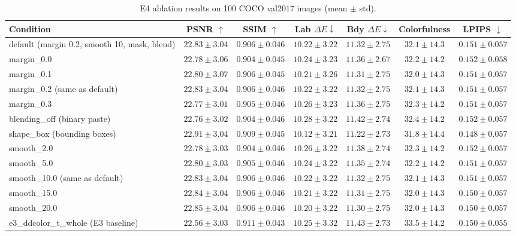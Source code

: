 \documentclass{FastFyp}
\begin{document}
\begin{table}[htbp]
\centering
\caption{E4 ablation results on 100 COCO val2017 images (mean $\pm$ std).}
\label{tab:e4-summary}
\small
\begin{tabular}{lcccccc}
\hline
Condition & PSNR $\uparrow$ & SSIM $\uparrow$ & Lab $\Delta E\downarrow$ & Bdy $\Delta E\downarrow$ & Colorfulness & LPIPS $\downarrow$ \\
\hline
default (margin 0.2, smooth 10, mask, blend) & $22.83\pm3.04$ & $0.906\pm0.046$ & $10.22\pm3.22$ & $11.32\pm2.75$ & $32.1\pm14.3$ & $0.151\pm0.057$ \\
margin\_0.0 & $22.78\pm3.06$ & $0.904\pm0.045$ & $10.24\pm3.23$ & $11.36\pm2.67$ & $32.2\pm14.2$ & $0.152\pm0.058$ \\
margin\_0.1 & $22.80\pm3.07$ & $0.906\pm0.045$ & $10.21\pm3.26$ & $11.31\pm2.75$ & $32.0\pm14.3$ & $0.151\pm0.057$ \\
margin\_0.2 (same as default) & $22.83\pm3.04$ & $0.906\pm0.046$ & $10.22\pm3.22$ & $11.32\pm2.75$ & $32.1\pm14.3$ & $0.151\pm0.057$ \\
margin\_0.3 & $22.77\pm3.01$ & $0.905\pm0.046$ & $10.26\pm3.23$ & $11.36\pm2.75$ & $32.3\pm14.2$ & $0.151\pm0.057$ \\
blending\_off (binary paste) & $22.76\pm3.02$ & $0.904\pm0.046$ & $10.28\pm3.22$ & $11.42\pm2.74$ & $32.4\pm14.2$ & $0.152\pm0.057$ \\
shape\_box (bounding boxes) & $22.91\pm3.04$ & $0.909\pm0.045$ & $10.12\pm3.21$ & $11.22\pm2.73$ & $31.8\pm14.4$ & $0.148\pm0.057$ \\
smooth\_2.0 & $22.78\pm3.03$ & $0.904\pm0.046$ & $10.26\pm3.22$ & $11.38\pm2.74$ & $32.3\pm14.2$ & $0.152\pm0.057$ \\
smooth\_5.0 & $22.80\pm3.03$ & $0.905\pm0.046$ & $10.24\pm3.22$ & $11.35\pm2.74$ & $32.2\pm14.2$ & $0.151\pm0.057$ \\
smooth\_10.0 (same as default) & $22.83\pm3.04$ & $0.906\pm0.046$ & $10.22\pm3.22$ & $11.32\pm2.75$ & $32.1\pm14.3$ & $0.151\pm0.057$ \\
smooth\_15.0 & $22.84\pm3.04$ & $0.906\pm0.046$ & $10.21\pm3.22$ & $11.31\pm2.75$ & $32.0\pm14.3$ & $0.150\pm0.057$ \\
smooth\_20.0 & $22.85\pm3.04$ & $0.906\pm0.046$ & $10.20\pm3.22$ & $11.30\pm2.75$ & $32.0\pm14.3$ & $0.150\pm0.057$ \\
e3\_ddcolor\_t\_whole (E3 baseline) & $22.56\pm3.03$ & $0.911\pm0.043$ & $10.25\pm3.32$ & $11.43\pm2.73$ & $33.5\pm14.2$ & $0.150\pm0.055$ \\
\hline
\end{tabular}
\end{table}
\end{document}
